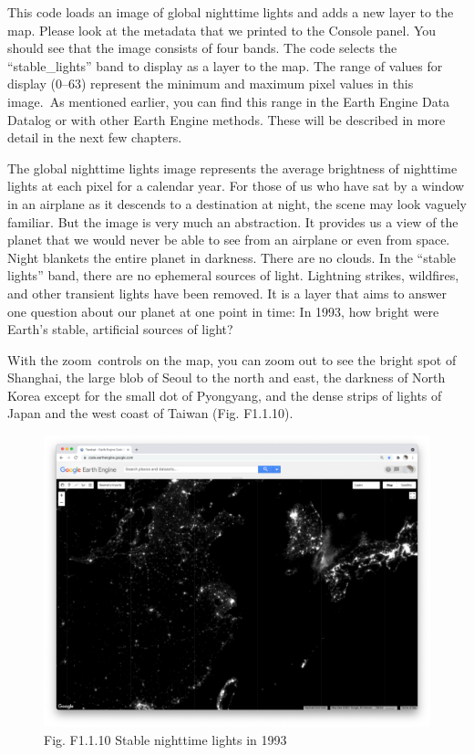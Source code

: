 \documentclass[
  letterpaper,
  DIV=11,
  numbers=noendperiod]{scrreprt}
\begin{document}
This code loads an image of global nighttime lights and adds a new layer
to the map. Please look at the metadata that we printed to the Console
panel. You should see that the image consists of four bands. The code
selects the ``stable\_lights'' band to display as a layer to the map.
The range of values for display (0--63) represent the minimum and
maximum pixel values in this image.~As mentioned earlier, you can find
this range in the Earth Engine Data Datalog or with other Earth Engine
methods. These will be described in more detail in the next few
chapters.

The global nighttime lights image represents the average brightness of
nighttime lights at each pixel for a calendar year. For those of us who
have sat by a window in an airplane as it descends to a destination at
night, the scene may look vaguely familiar. But the image is very much
an abstraction. It provides us a view of the planet that we would never
be able to see from an airplane or even from space. Night blankets the
entire planet in darkness. There are no clouds. In the ``stable lights''
band, there are no ephemeral sources of light. Lightning strikes,
wildfires, and other transient lights have been removed. It is a layer
that aims to answer one question about our planet at one point in time:
In 1993, how bright were Earth's stable, artificial sources of light?

With the zoom~controls on the map, you can zoom out to see the bright
spot of Shanghai, the large blob of Seoul to the north and east, the
darkness of North Korea except for the small dot of Pyongyang, and the
dense strips of lights of Japan and the west coast of Taiwan (Fig.
F1.1.10). ~

\begin{figure}

{\centering \includegraphics{./F1/image34.png}

}

\caption{Fig. F1.1.10 Stable nighttime lights in 1993}

\end{figure}
\end{document}
